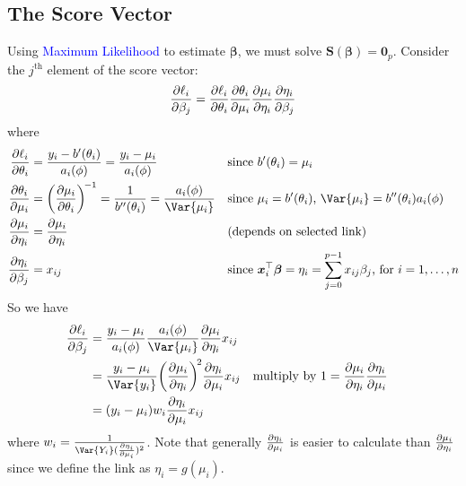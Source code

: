 \documentclass[oneside]{book}\usepackage[]{graphicx}\usepackage[svgnames]{xcolor}
\providecommand{\Vector}[1]{\bm{#1}}%
\begin{document}
\subsection*{The Score Vector}
Using \textcolor{Blue}{Maximum Likelihood} to estimate $ \Vector{\beta} $, we must solve $ \Vector{S}(\Vector{\beta})=\Vector{0}_p $.
Consider the $ j^{\text{th}} $ element of the score vector:
\[ \pdv{\ell_i}{\beta_j}=\pdv{\ell_i}{\theta_i}\pdv{\theta_i}{\mu_i}\pdv{\mu_i}{\eta_i}\pdv{\eta_i}{\beta_j} \]
where
\begin{align*}
    \pdv{\ell_i}{\theta_i} & =\frac{y_i-b^\prime(\theta_i)}{a_i(\phi)}=\frac{y_i-\mu_i}{a_i(\phi)}                                            &  & \text{since $b^\prime(\theta_i)=\mu_i$}                                                                  \\
    \pdv{\theta_i}{\mu_i}  & =\biggl(\pdv{\mu_i}{\theta_i}\biggr)^{\!-1}  =\frac{1}{b^{\prime\prime}(\theta_i)}=\frac{a_i(\phi)}{\Var{\mu_i}} &  & \text{since $\mu_i=b^{\prime}(\theta_i)$, $\Var{\mu_i}=b^{\prime\prime}(\theta_i)a_i(\phi)$}             \\
    \pdv{\mu_i}{\eta_i}    & =\pdv{\mu_i}{\eta_i}                                                                                             &  & \text{(depends on selected link)}                                                                        \\
    \pdv{\eta_i}{\beta_j}  & =x_{ij}                                                                                                          &  & \text{since $\Vector{x}_i^\top \Vector{\beta}=\eta_i=\sum_{j=0}^{p-1}x_{ij}\beta_j$, for $i=1,\ldots,n$}
\end{align*}
So we have
\begin{align*}
    \pdv{\ell_i}{\beta_j}
     & =\frac{y_i-\mu_i}{a_i(\phi)}\frac{a_i(\phi)}{\Var{\mu_i}}\pdv{\mu_i}{\eta_i}x_{ij}                                                                              \\
     & =\frac{y_i-\mu_i}{\Var{y_i}}\biggl(\pdv{\mu_i}{\eta_i}\biggr)^{\!2}\pdv{\eta_i}{\mu_i}x_{ij} &  & \text{multiply by $1=\pdv{\mu_i}{\eta_i}\pdv{\eta_i}{\mu_i}$} \\
     & =(y_i-\mu_i)w_i\pdv{\eta_i}{\mu_i}x_{ij}
\end{align*}
where $ w_i=\frac{1}{\Var{Y_i}(\pdv{\eta_i}{\mu_i})^2} $. Note that generally $ \pdv{\eta_i}{\mu_i} $ is easier to calculate than $ \pdv{\mu_i}{\eta_i} $
since we define the link as $ \eta_i=g(\mu_i) $.
\end{document}
